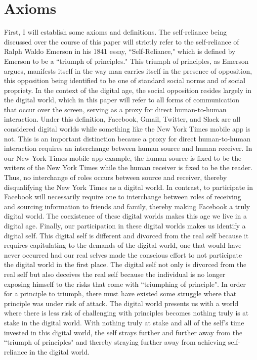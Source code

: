 \documentclass[12pt,letterpaper]{article}
\begin{document}
\section{Axioms}
First, I will establish some axioms and definitions.  The self-reliance being 
discussed over the course of this paper will strictly refer to the self-reliance of 
Ralph Waldo Emerson in his 1841 essay, ``Self-Reliance," which is defined by 
Emerson to be a ``triumph of principles."  This triumph of principles, as 
Emerson argues, manifests itself in the way man carries itself in the presence 
of opposition, this opposition being identified to be one of standard social 
norms and of social propriety.  In the context of the digital age, the social opposition 
resides largely in the digital world, which in this paper will refer to all forms of 
communication that occur over the screen, serving as a proxy for direct 
human-to-human interaction.  Under this definition, Facebook, Gmail, 
Twitter, and Slack are all considered digital worlds while something like the 
New York Times mobile app is not.  This is an important distinction because a 
proxy for direct human-to-human interaction requires an interchange between 
human source and human receiver.  In our New York Times mobile app 
example, the human source is fixed to be the writers of the New York Times 
while the human receiver is fixed to be the reader.  Thus, no interchange of 
roles occurs between source and receiver, thereby disqualifying the New York 
Times as a digital world.  In contrast, to participate in Facebook will 
necessarily require one to interchange between roles of receiving and sourcing 
information to friends and family, thereby making Facebook a truly digital 
world.  The coexistence of these digital worlds makes this age we live in a 
digital age.  Finally, our participation in these digital worlds makes us identify a digital self.  This digital self is different and divorced from the real self because it requires capitulating to the demands of the digital world, one that would have never occurred had our real selves made the conscious effort to not participate the digital world in the first place.  The digital self not only is divorced from the real self but also deceives the real self because the individual is no longer exposing himself to the risks that come with ``triumphing of principle".  In order for a principle to triumph, there must have existed some struggle where that principle was under risk of attack.  The digital world presents us with a world where there is less risk of challenging with principles becomes nothing truly is at stake in the digital world.  With nothing truly at stake and all of the self's time invested in this digital world, the self strays further and further away from the ``triumph of principles" and thereby straying further away from achieving self-reliance in the digital world.
\end{document}
